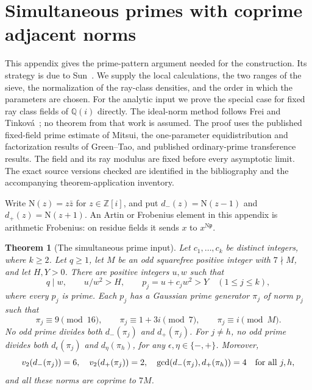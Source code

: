 \documentclass[11pt]{article}
\newtheorem{theorem}{Theorem}[section]
\theoremstyle{definition}
\theoremstyle{remark}
\newcommand{\Q}{\mathbb Q}
\begin{document}
\section{Simultaneous primes with coprime adjacent norms}
\label{sec:v5-sun-proof}

This appendix gives the prime-pattern argument needed for the construction.
Its strategy is due to Sun~\cite{v5sun}. We supply the local calculations,
the two ranges of the sieve, the normalization of the ray-class densities,
and the order in which the parameters are chosen. For the analytic input
we prove the special case for fixed ray class fields of $\Q(i)$ directly.
The ideal-norm method follows Frei and Tinkov\'a~\cite{v5ft}; no theorem
from that work is assumed. The proof uses the published fixed-field prime
estimate of Mitsui, the one-parameter equidistribution and factorization
results of Green--Tao, and published ordinary-prime transference results.
The field and its ray modulus are fixed before every asymptotic limit.
The exact source versions checked are identified in the bibliography
and the accompanying theorem-application inventory.

Write $\mathrm N(z)=z\bar z$ for $z\in\mathbb Z[i]$, and put
$d_-(z)=\mathrm N(z-1)$ and $d_+(z)=\mathrm N(z+1)$.
An Artin or Frobenius element in this appendix is arithmetic Frobenius:
on residue fields it sends $x$ to $x^{\mathrm N\mathfrak p}$.

\begin{theorem}[The simultaneous prime input]\label{thm:v5-simultaneous-primes}
Let $c_1,\ldots,c_k$ be distinct integers, where $k\geq2$.
Let $q\geq1$, let $M$ be an odd squarefree positive integer with $7\nmid M$,
and let $H,Y>0$. There are positive integers $u,w$ such that
\[
 q\mid w,\qquad u/w^2>H,\qquad p_j=u+c_jw^2>Y
 \quad(1\leq j\leq k),
\]
where every $p_j$ is prime. Each $p_j$ has a Gaussian prime generator
$\pi_j$ of norm $p_j$ such that
\[
 \pi_j\equiv9\pmod {16},\qquad
 \pi_j\equiv1+3i\pmod7,\qquad
 \pi_j\equiv i\pmod M.
\]
No odd prime divides both $d_-(\pi_j)$ and $d_+(\pi_j)$.
For $j\ne h$, no odd prime divides both $d_\epsilon(\pi_j)$ and
$d_\eta(\pi_h)$, for any $\epsilon,\eta\in\{-,+\}$.
Moreover,
\[
 v_2(d_-(\pi_j))=6,\quad v_2(d_+(\pi_j))=2,\quad
 \gcd(d_-(\pi_j),d_+(\pi_h))=4\quad\hbox{for all }j,h,
\]
and all these norms are coprime to $7M$.
\end{theorem}
\end{document}
